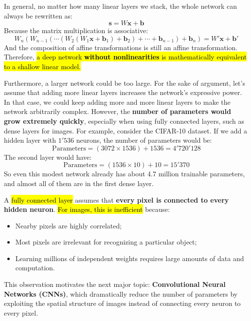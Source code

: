 \highspace
In general, no matter how many linear layers we stack, the whole network can always be rewritten as:
\begin{equation*}
    \mathbf{s} = W \mathbf{x} + \mathbf{b}
\end{equation*}
Because the matrix multiplication is associative:
\begin{equation*}
    W_n \left(W_{n-1} \left(\cdots \left(W_2 \left(W_1 \mathbf{x} + \mathbf{b}_1\right) + \mathbf{b}_2\right) + \cdots + \mathbf{b}_{n-1}\right) + \mathbf{b}_n\right) = W' \mathbf{x} + \mathbf{b}'
\end{equation*}
And the composition of affine transformations is still an affine transformation. Therefore, \hl{a deep network \textbf{without nonlinearities} is mathematically equivalent to a shallow linear model.}

\highspace
Furthermore, a larger network could be too large. For the sake of argument, let's assume that adding more linear layers increases the network's expressive power. In that case, we could keep adding more and more linear layers to make the network arbitrarily complex. However, the \textbf{number of parameters would grow extremely quickly}, especially when using fully connected layers, such as dense layers for images. For example, consider the CIFAR-10 dataset. If we add a hidden layer with $1'536$ neurons, the number of parameters would be:
\begin{equation*}
    \text{Parameters} = (3072 \times 1536) + 1536 = 4'720'128
\end{equation*}
The second layer would have:
\begin{equation*}
    \text{Parameters} = (1536 \times 10) + 10 = 15'370
\end{equation*}
So even this modest network already has about 4.7 million trainable parameters, and almost all of them are in the first dense layer.

\highspace
A \hl{fully connected layer} assumes that \textbf{every pixel is connected to every hidden neuron}. \hl{For images, this is inefficient} because:
\begin{itemize}
    \item Nearby pixels are highly correlated;
    \item Most pixels are irrelevant for recognizing a particular object;
    \item Learning millions of independent weights requires large amounts of data and computation.
\end{itemize}
This observation motivates the next major topic: \textbf{Convolutional Neural Networks (CNNs)}, which dramatically reduce the number of parameters by exploiting the spatial structure of images instead of connecting every neuron to every pixel.